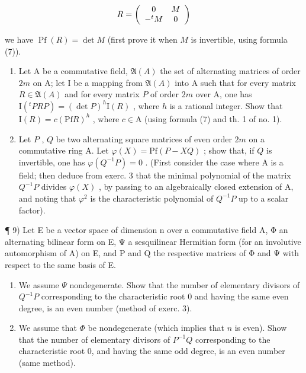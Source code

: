 \[
R = \left( \begin{array}{c c} 0 & M \\ - ^ {t} M & 0 \end{array} \right)
\]

we have \(\operatorname{Pf}(R) = \det M\) (first prove it when \(M\) is invertible, using formula (7)).

\begin{enumerate}
\def\labelenumi{\arabic{enumi})}
\setcounter{enumi}{6}
\item
  Let A be a commutative field, \(\mathfrak{A}(A)\) the set of alternating matrices of order \(2m\) on A; let I be a mapping from \(\mathfrak{A}(A)\) into A such that for every matrix \(R\in\mathfrak{A}(A)\) and for every matrix \(P\) of order \(2m\) over A, one has \(\mathrm{I}(^{t}PRP)=(\det P)^{h}\mathrm{I}(R)\) , where \(h\) is a rational integer. Show that \(\mathrm{I}(R)=c(\mathrm{Pf}R)^{h}\) , where \(c\in\mathrm{A}\) (using formula (7) and th. 1 of no. 1).
\item
  Let \(P\) , \(Q\) be two alternating square matrices of even order \(2m\) on a commutative ring A. Let \(\varphi(X) = \mathrm{Pf}(P - XQ)\) ; show that, if \(Q\) is invertible, one has \(\varphi(Q^{-1}P)=0\) . (First consider the case where A is a field; then deduce from exerc. 3 that the minimal polynomial of the matrix \(Q^{-1}P\) divides \(\varphi(X)\) , by passing to an algebraically closed extension of A, and noting that \(\varphi^{2}\) is the characteristic polynomial of \(Q^{-1}P\) up to a scalar factor).
\end{enumerate}

¶ 9) Let E be a vector space of dimension n over a commutative field A, Φ an alternating bilinear form on E, Ψ a sesquilinear Hermitian form (for an involutive automorphism of A) on E, and P and Q the respective matrices of Φ and Ψ with respect to the same basis of E.

\begin{enumerate}
\def\labelenumi{\alph{enumi})}
\item
  We assume \(\Psi\) nondegenerate. Show that the number of elementary divisors of \(Q^{-1}P\) corresponding to the characteristic root 0 and having the same even degree, is an even number (method of exerc. 3).
\item
  We assume that \(\Phi\) be nondegenerate (which implies that \(n\) is even). Show that the number of elementary divisors of \(P^{-1}Q\) corresponding to the characteristic root 0, and having the same odd degree, is an even number (same method).
\end{enumerate}

